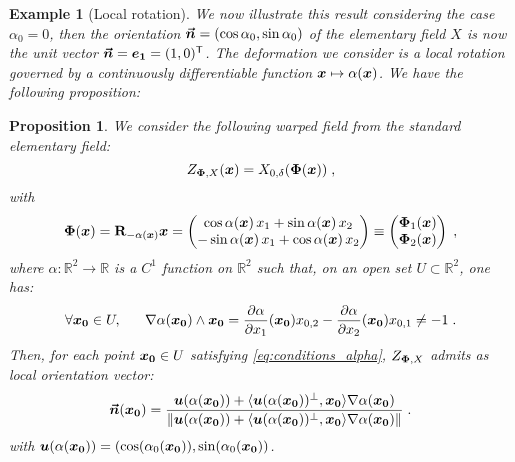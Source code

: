\documentclass{elsarticle}
\newtheorem{proposition}{Proposition}
\newtheorem{example}{Example}
\def\R{\mbox{$\mathbb{R}$}}
\begin{document}
\begin{example}[Local rotation]
We now illustrate this result considering the case $\alpha_0=0$, then the orientation $\bm{\vec n}=(\cos \alpha_0, \sin \alpha_0)$ of the elementary field $X$ is now the unit vector $\bm{\vec n}=\bm{e_1}=(1,0)^{\mathsf{T}}$. The deformation we consider is a local rotation governed by a continuously differentiable function $\bm{x}\mapsto \alpha(\bm{x})$. We have the following proposition:
\end{example}
\begin{proposition}
We consider the following warped field from the standard elementary field:
\[
Z_{\mathbf{\Phi},X}(\bm{x})=X_{0,\delta}(\mathbf{\Phi}(\bm{x}))\;,
\] 
with
\begin{equation}
\label{eq:deformation}
\mathbf{\Phi}(\bm{x})=\mathbf{R}_{-\alpha(\bm{x})}\bm{x}=\begin{pmatrix}\cos \alpha(\bm{x})\, x_1+\sin \alpha(\bm{x})\, x_2\\ -\sin \alpha(\bm{x})\, x_1+\cos \alpha(\bm{x})\, x_2\end{pmatrix}\equiv \begin{pmatrix}\mathbf{\Phi}_1(\bm{x})\\ \mathbf{\Phi}_2(\bm{x})\end{pmatrix}\;,
\end{equation}
where $\alpha:\mathbb{R}^2\to \mathbb{R}$ is a $C^1$ function on $\mathbb{R}^2$ such that, on an open set $U\subset \R^2$, one has: 
\begin{equation}\label{eq:conditions_alpha}
\forall \bm{x_0}\in U, ~~~~~\nabla \alpha (\bm{x_0})  \wedge \bm{x_0} = \frac{\partial \alpha}{\partial x_1}(\bm{x_0})x_{0,2}-\frac{\partial \alpha}{\partial x_2}(\bm{x_0})x_{0,1} \neq -1\;.
\end{equation}
Then, for each point $\bm{x_0}\in U$ satisfying \eqref{eq:conditions_alpha}, $Z_{\mathbf{\Phi},X}$ admits as local orientation vector:
\begin{equation}\label{eq:orientation_not_prescribed}
\bm{\vec n}(\bm{x_0})=\frac{\bm{u}(\alpha(\bm{x_0}))+\langle \bm{u}(\alpha(\bm{x_0}))^{\perp},\bm{x_0}\rangle \nabla \alpha(\bm{x_0})}{\|\bm{u}(\alpha(\bm{x_0}))+\langle \bm{u}(\alpha(\bm{x_0}))^{\perp},\bm{x_0}\rangle \nabla \alpha(\bm{x_0})\|}\;.
\end{equation}
with $\bm{u}(\alpha(\bm{x_0}))=(\cos (\alpha_0(\bm{x_0})), \sin (\alpha_0(\bm{x_0}))$.
\end{proposition}
\end{document}
